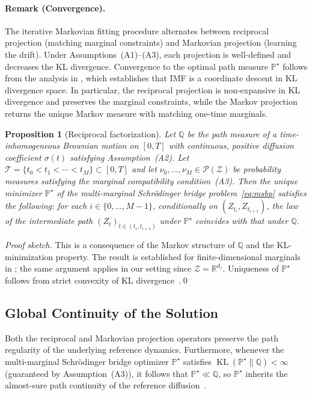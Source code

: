 \documentclass[review,onefignum,onetabnum]{siamart250211}
\newtheorem{proposition}{Proposition}
\newcommand{\R}{\mathbb{R}}
\newcommand{\KL}{\operatorname{KL}}
\newcommand{\1}{\mathbf{1}}
\newcommand{\cZ}{\mathcal{Z}}
\newcommand{\cP}{\mathcal{P}}
\begin{document}
\paragraph{Remark (Convergence).}
The iterative Markovian fitting procedure alternates between reciprocal projection (matching marginal constraints) and Markovian projection (learning the drift). Under Assumptions~(A1)--(A3), each projection is well-defined and decreases the KL divergence. Convergence to the optimal path measure $\mathbb{P}^\star$ follows from the analysis in \cite{shi2024sbm,peluchetti2023}, which establishes that IMF is a coordinate descent in KL divergence space. In particular, the reciprocal projection is non-expansive in KL divergence and preserves the marginal constraints, while the Markov projection returns the unique Markov measure with matching one-time marginals.

\begin{proposition}[Reciprocal factorization]
\label{prop:reciprocal_factorization}
Let $\mathbb{Q}$ be the path measure of a time-inhomogeneous Brownian motion on $[0,T]$ with continuous, positive diffusion coefficient $\sigma(t)$ satisfying Assumption~\emph{(A2)}. Let $\mathcal{T}=\{t_0<t_1<\cdots<t_M\}\subset[0,T]$ and let $\nu_0,\dots,\nu_M\in\cP(\cZ)$ be probability measures satisfying the marginal compatibility condition~\emph{(A3)}. Then the unique minimizer $\mathbb{P}^\star$ of the multi-marginal Schr\"odinger bridge problem~\eqref{eq:msbp} satisfies the following: for each $i\in\{0,\dots,M-1\}$, conditionally on $(Z_{t_i},Z_{t_{i+1}})$, the law of the intermediate path $(Z_t)_{t\in(t_i,t_{i+1})}$ under $\mathbb{P}^\star$ coincides with that under $\mathbb{Q}$.
\end{proposition}

\noindent\emph{Proof sketch.}
This is a consequence of the Markov structure of $\mathbb{Q}$ and the KL-minimization property. The result is established for finite-dimensional marginals in \cite{park2025msbm,shi2024sbm}; the same argument applies in our setting since $\cZ=\R^{d_z}$. Uniqueness of $\mathbb{P}^\star$ follows from strict convexity of KL divergence~\cite{leonard2013survey}.\qed

\subsection{Global Continuity of the Solution}
Both the reciprocal and Markovian projection operators preserve the path regularity of the underlying reference dynamics. Furthermore, whenever the multi-marginal Schr\"odinger bridge optimizer $\mathbb{P}^\star$ satisfies $\KL(\mathbb{P}^\star \| \mathbb{Q}) < \infty$ (guaranteed by Assumption~(A3)), it follows that $\mathbb{P}^\star \ll \mathbb{Q}$, so $\mathbb{P}^\star$ inherits the almost-sure path continuity of the reference diffusion~\cite{park2025msbm}.
\end{document}

